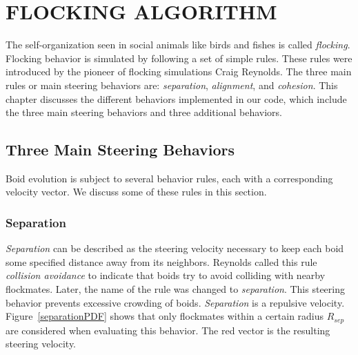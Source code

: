 \chapter{FLOCKING ALGORITHM}\label{chap3}

The self-organization seen in social animals like birds and fishes is called \textit{flocking}. Flocking behavior is simulated by following a set of simple rules. These rules were introduced by the pioneer of flocking simulations Craig Reynolds\cite{craig1}. The three main rules or main steering behaviors are: \textit{separation}, \textit{alignment}, and \textit{cohesion}. This chapter discusses the different behaviors implemented in our code, which include the three main steering behaviors and three additional behaviors.

\section{Three Main Steering Behaviors}
Boid evolution is subject to several behavior rules, each with a corresponding
velocity vector. We discuss some of these rules in this section. 


	

\subsection{Separation}\label{separationsection}
\textit{Separation} can be described as the steering velocity necessary to keep each boid some specified distance away from its neighbors. Reynolds called this rule \textit{collision avoidance} to indicate that boids try to avoid colliding with nearby flockmates. Later, the name of the rule was changed to \textit{separation}. This steering behavior prevents excessive crowding of boids. \textit{Separation} is a repulsive velocity. Figure~\ref{separationPDF} shows that only flockmates within a certain radius $R_{sep}$ are considered when evaluating this behavior. The red vector is the resulting steering velocity.

